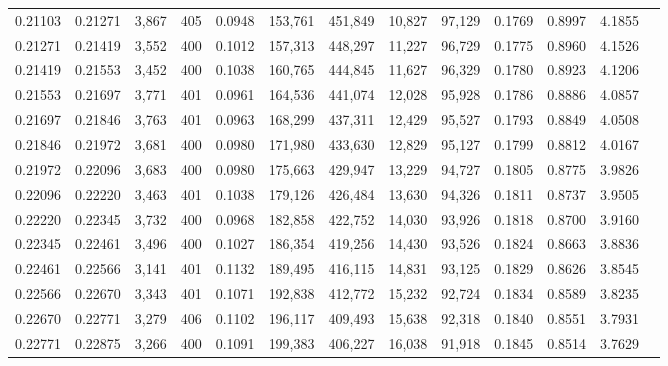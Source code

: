 \begin{tabular}{rrrrrrrrrrrrr}
0.21103 & 0.21271 &  3,867 & 405 &                                     0.0948 & 153,761 & 451,849 &  10,827 &  97,129 & 0.1769 & 0.8997 & 4.1855 \\
0.21271 & 0.21419 &  3,552 & 400 &                                     0.1012 & 157,313 & 448,297 &  11,227 &  96,729 & 0.1775 & 0.8960 & 4.1526 \\
0.21419 & 0.21553 &  3,452 & 400 &                                     0.1038 & 160,765 & 444,845 &  11,627 &  96,329 & 0.1780 & 0.8923 & 4.1206 \\
0.21553 & 0.21697 &  3,771 & 401 &                                     0.0961 & 164,536 & 441,074 &  12,028 &  95,928 & 0.1786 & 0.8886 & 4.0857 \\
0.21697 & 0.21846 &  3,763 & 401 &                                     0.0963 & 168,299 & 437,311 &  12,429 &  95,527 & 0.1793 & 0.8849 & 4.0508 \\
0.21846 & 0.21972 &  3,681 & 400 &                                     0.0980 & 171,980 & 433,630 &  12,829 &  95,127 & 0.1799 & 0.8812 & 4.0167 \\
0.21972 & 0.22096 &  3,683 & 400 &                                     0.0980 & 175,663 & 429,947 &  13,229 &  94,727 & 0.1805 & 0.8775 & 3.9826 \\
0.22096 & 0.22220 &  3,463 & 401 &                                     0.1038 & 179,126 & 426,484 &  13,630 &  94,326 & 0.1811 & 0.8737 & 3.9505 \\
0.22220 & 0.22345 &  3,732 & 400 &                                     0.0968 & 182,858 & 422,752 &  14,030 &  93,926 & 0.1818 & 0.8700 & 3.9160 \\
0.22345 & 0.22461 &  3,496 & 400 &                                     0.1027 & 186,354 & 419,256 &  14,430 &  93,526 & 0.1824 & 0.8663 & 3.8836 \\
0.22461 & 0.22566 &  3,141 & 401 &                                     0.1132 & 189,495 & 416,115 &  14,831 &  93,125 & 0.1829 & 0.8626 & 3.8545 \\
0.22566 & 0.22670 &  3,343 & 401 &                                     0.1071 & 192,838 & 412,772 &  15,232 &  92,724 & 0.1834 & 0.8589 & 3.8235 \\
0.22670 & 0.22771 &  3,279 & 406 &                                     0.1102 & 196,117 & 409,493 &  15,638 &  92,318 & 0.1840 & 0.8551 & 3.7931 \\
0.22771 & 0.22875 &  3,266 & 400 &                                     0.1091 & 199,383 & 406,227 &  16,038 &  91,918 & 0.1845 & 0.8514 & 3.7629 \\

\end{tabular}
